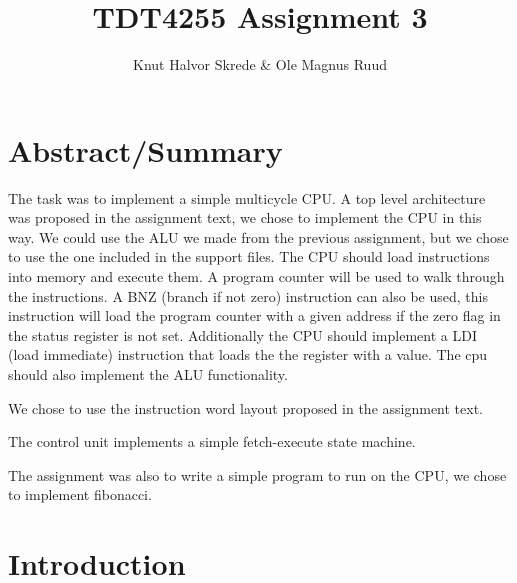 \documentclass[11pt]{report}
\title{TDT4255 Assignment 3}
\author{Knut Halvor Skrede \& Ole Magnus Ruud}
\begin{document}
\maketitle
\clearpage


\section*{Abstract/Summary}
        

The task was to implement a simple multicycle CPU. A top level architecture 
was proposed in the assignment text, we chose to implement the CPU in this way. 
We could use the ALU we made from the previous assignment, but we chose to use
the one included in the support files. The CPU should load instructions into 
memory and execute them. A program counter will be used to walk through the 
instructions. A BNZ (branch if not zero) instruction can also be used, this 
instruction will load the program counter with a given address if the zero flag
in the status register is not set. Additionally the CPU should implement a 
LDI (load immediate) instruction that loads the the register with a value. 
The cpu should also implement the ALU functionality.

We chose to use the instruction word layout proposed in the assignment text.

The control unit implements a simple fetch-execute state machine.

The assignment was also to write a simple program to run on the CPU, 
we chose to implement fibonacci.

\section*{Introduction}

\end{document}
